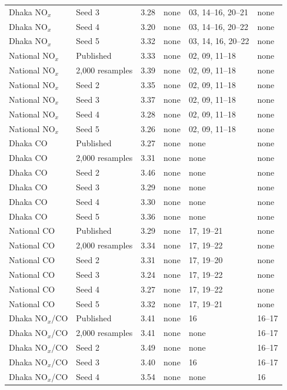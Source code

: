 \begin{longtable}{L{2.6cm} L{2.4cm} C{0.9cm} L{2.0cm} L{3.6cm} L{2.0cm}}
Dhaka NO$_x$ & Seed 3 & 3.28 & none & 03, 14--16, 20--21 & none \\
Dhaka NO$_x$ & Seed 4 & 3.20 & none & 03, 14--16, 20--22 & none \\
Dhaka NO$_x$ & Seed 5 & 3.32 & none & 03, 14, 16, 20--22 & none \\
National NO$_x$ & Published & 3.33 & none & 02, 09, 11--18 & none \\
National NO$_x$ & 2,000 resamples & 3.39 & none & 02, 09, 11--18 & none \\
National NO$_x$ & Seed 2 & 3.35 & none & 02, 09, 11--18 & none \\
National NO$_x$ & Seed 3 & 3.37 & none & 02, 09, 11--18 & none \\
National NO$_x$ & Seed 4 & 3.28 & none & 02, 09, 11--18 & none \\
National NO$_x$ & Seed 5 & 3.26 & none & 02, 09, 11--18 & none \\
Dhaka CO & Published & 3.27 & none & none & none \\
Dhaka CO & 2,000 resamples & 3.31 & none & none & none \\
Dhaka CO & Seed 2 & 3.46 & none & none & none \\
Dhaka CO & Seed 3 & 3.29 & none & none & none \\
Dhaka CO & Seed 4 & 3.30 & none & none & none \\
Dhaka CO & Seed 5 & 3.36 & none & none & none \\
National CO & Published & 3.29 & none & 17, 19--21 & none \\
National CO & 2,000 resamples & 3.34 & none & 17, 19--22 & none \\
National CO & Seed 2 & 3.31 & none & 17, 19--20 & none \\
National CO & Seed 3 & 3.24 & none & 17, 19--22 & none \\
National CO & Seed 4 & 3.27 & none & 17, 19--22 & none \\
National CO & Seed 5 & 3.32 & none & 17, 19--21 & none \\
Dhaka NO$_x$/CO & Published & 3.41 & none & 16 & 16--17 \\
Dhaka NO$_x$/CO & 2,000 resamples & 3.41 & none & none & 16--17 \\
Dhaka NO$_x$/CO & Seed 2 & 3.49 & none & none & 16--17 \\
Dhaka NO$_x$/CO & Seed 3 & 3.40 & none & 16 & 16--17 \\
Dhaka NO$_x$/CO & Seed 4 & 3.54 & none & none & 16 \\

\end{longtable}
